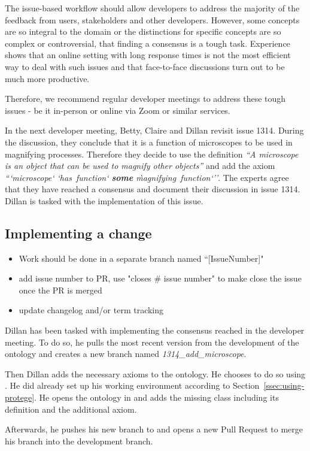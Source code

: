 The issue-based workflow should allow developers to address the majority of the feedback from users, stakeholders and other developers. However, some concepts are so integral to the domain or the distinctions for specific concepts are so complex or controversial, that finding a consensus is a tough task. Experience shows that an online setting with long response times is not the most efficient way to deal with such issues and that face-to-face discussions turn out to be much more productive.

Therefore, we recommend regular developer meetings to address these tough issues - be it in-person or online via Zoom or similar services. 

\begin{example}
In the next developer meeting, Betty, Claire and Dillan revisit issue 1314. During the discussion, they conclude that it is a function of microscopes to be used in magnifying processes. Therefore they decide to use the definition \emph{``A microscope is an object that can be used to magnify other objects''} and add the axiom
\emph{```microscope` `has~function` \textbf{some} \`magnifying~function`''}.
The experts agree that they have reached a consensus and document their discussion in issue 1314. Dillan is tasked with the implementation of this issue.
\end{example}

\subsection{Implementing a change}
\begin{itemize}
    \item  Work should be done in a separate branch named ``[IssueNumber]"
    \item add issue number to PR, use "closes \# issue number" to make {\github} close the issue once the PR is merged
    \item update changelog and/or term tracking
\end{itemize}

\begin{example}
Dillan has been tasked with implementing the consensus reached in the developer meeting. To do so, he pulls the most recent version from the development of the ontology and creates a new branch named \textit{1314\_add\_microscope}.

Then Dillan adds the necessary axioms to the ontology. He chooses to do so using {\protege}. He did already set up his working environment according to Section~\ref{ssec:using-protege}. He opens the ontology in {\protege} and adds the missing class including its definition and the additional axiom.

Afterwards, he pushes his new branch to {\github} and opens a new Pull Request to merge his branch into the development branch.
\end{example}

